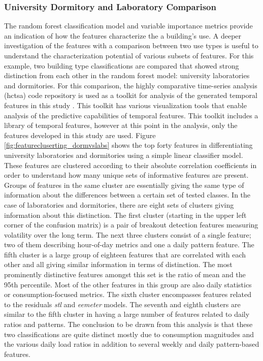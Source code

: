 \subsubsection{University Dormitory and Laboratory Comparison}
\label{sec:dormvslab}

The random forest classification model and variable importance metrics provide an indication of how the features characterize the a building's use. A deeper investigation of the features with a comparison between two use types is useful to understand the characterization potential of various subsets of features. For this example, two building type classifications are compared that showed strong distinction from each other in the random forest model: university laboratories and dormitories. For this comparison, the highly comparative time-series analysis (hctsa) code repository is used as a toolkit for analysis of the generated temporal features in this study \cite{Fulcher_2013}. This toolkit has various visualization tools that enable analysis of the predictive capabilities of temporal features. This toolkit includes a library of temporal features, however at this point in the analysis, only the features developed in this study are used. Figure \ref{fig:featurecluserting_dormvslabs} shows the top forty features in differentiating university laboratories and dormitories using a simple linear classifier model. These features are clustered according to their absolute correlation coefficients in order to understand how many unique sets of informative features are present. Groups of features in the same cluster are essentially giving the same type of information about the differences between a certain set of tested classes. In the case of laboratories and dormitories, there are eight sets of clusters giving information about this distinction. The first cluster (starting in the upper left corner of the confusion matrix) is a pair of breakout detection features measuring volatility over the long term. The next three clusters consist of a single feature; two of them describing hour-of-day metrics and one a daily pattern feature. The fifth cluster is a large group of eighteen features that are correlated with each other and all giving similar information in terms of distinction. The most prominently distinctive features amongst this set is the ratio of mean and the 95th percentile. Most of the other features in this group are also daily statistics or consumption-focused metrics. The sixth cluster encompasses features related to the residuals \emph{stl} and \emph{eemeter} models. The seventh and eighth clusters are similar to the fifth cluster in having a large number of features related to daily ratios and patterns. The conclusion to be drawn from this analysis is that these two classifications are quite distinct mostly due to consumption magnitudes and the various daily load ratios in addition to several weekly and daily pattern-based features.